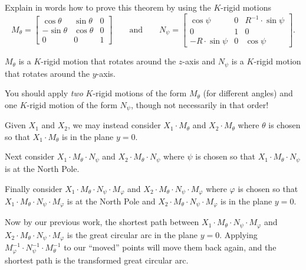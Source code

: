 \documentclass{ximera}
\begin{document}
\begin{problem}
  Explain in words how to prove this theorem by using the $K$-rigid
  motions
  \[
  M_\theta=
  \begin{bmatrix}
    \cos\theta & \sin\theta & 0\\
    -\sin\theta & \cos\theta & 0\\
    0 & 0 & 1
  \end{bmatrix}
  \qquad\text{and}\qquad
  N_\psi=
  \begin{bmatrix}
    \cos\psi & 0 & R^{-1}\cdot\sin\psi\\
    0 & 1 & 0\\
    -R\cdot\sin\psi & 0 & \cos\psi
  \end{bmatrix}.
  \]
  \begin{hint}
    $M_\theta$ is a $K$-rigid motion that rotates around the $z$-axis and
    $N_\psi$ is a $K$-rigid motion that rotates around the $y$-axis.
  \end{hint}
  \begin{hint}
    You should apply \textit{two} $K$-rigid motions of the form
    $M_\theta$ (for different angles) and one $K$-rigid motion of the
    form $N_\psi$, though not necessarily in that order!
  \end{hint}
  \begin{freeResponse}
    Given $X_1$ and $X_2$, we may instead consider $X_1\cdot M_\theta$
    and $X_2\cdot M_\theta$ where $\theta$ is chosen so that $X_1\cdot
    M_\theta$ is in the plane $y=0$.

    Next consider $X_1\cdot M_\theta\cdot N_\psi$ and $X_2\cdot
    M_\theta\cdot N_\psi$ where $\psi$ is chosen so that $X_1\cdot
    M_\theta\cdot N_\psi$ is at the North Pole.

    Finally consider $X_1\cdot M_\theta\cdot N_\psi\cdot M_\varphi$
    and $X_2\cdot M_\theta\cdot N_\psi\cdot M_\varphi$ where $\varphi$
    is chosen so that $X_1\cdot M_\theta\cdot N_\psi\cdot M_\varphi$
    is at the North Pole and $X_2\cdot M_\theta\cdot N_\psi\cdot
    M_\varphi$ is in the plane $y=0$.

    Now by our previous work, the shortest path between $X_1\cdot
    M_\theta\cdot N_\psi\cdot M_\varphi$ and $X_2\cdot M_\theta\cdot
    N_\psi\cdot M_\varphi$ is the great circular arc in the plane
    $y=0$. Applying $M_\varphi^{-1}\cdot N_\psi^{-1}\cdot
    M_\theta^{-1}$ to our ``moved'' points will move them back again,
    and the shortest path is the transformed great circular arc.
  \end{freeResponse}
\end{problem}
\end{document}
